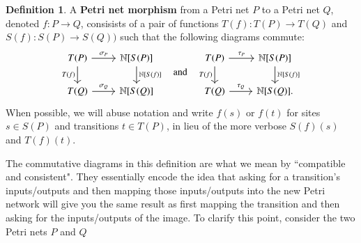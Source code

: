 \documentclass[aps,prd,onecolumn,nofootinbib,letterpaper,preprintnumbers,superscriptaddress,eqsecnum]{revtex4}
\theoremstyle{definition}
\newtheorem{definition}{Definition}
\newcommand{\N}{\mathbb{N}}
\begin{document}
\begin{definition}\label{def:petri-map}
    A \textbf{Petri net morphism} from a Petri net $P$ to a Petri net $Q$, denoted $f : P \rightarrow Q$, consisists of a pair of functions $T(f) : T(P) \rightarrow T(Q)$ and $S(f): S(P) \rightarrow S(Q))$ such that the following diagrams commute:
    \begin{equation*}
        \begin{tikzcd}
            T(P)
            \arrow[r, "\sigma_P"]
            \arrow[d, "T(f)", swap]
            &
            \N[S(P)]
            \arrow[d, "\N \lbrack S(f) \rbrack"]
            \\
            T(Q)
            \arrow[r, "\sigma_Q"]
            &
            \N[S(Q)]
        \end{tikzcd}
        \quad
        \textrm{and}
        \quad
        \begin{tikzcd}
            T(P)
            \arrow[r, "\tau_P"]
            \arrow[d, "T(f)", swap]
            &
            \N[S(P)]
            \arrow[d, "\N \lbrack S(f) \rbrack"]
            \\
            T(Q)
            \arrow[r, "\tau_Q"]
            &
            \N[S(Q)].
        \end{tikzcd}
    \end{equation*}
    When possible, we will abuse notation and write $f(s)$ or $f(t)$ for sites $s \in S(P)$ and transitions $t \in T(P)$, in lieu of the more verbose $S(f)(s)$ and $T(f)(t)$.
\end{definition}

The commutative diagrams in this definition are what we mean by ``compatible and consistent".
They essentially encode the idea that asking for a transition's inputs/outputs and then mapping those inputs/outputs into the new Petri network will give you the same result as first mapping the transition and then asking for the inputs/outputs of the image.
To clarify this point, consider the two Petri nets $P$ and $Q$
\end{document}
